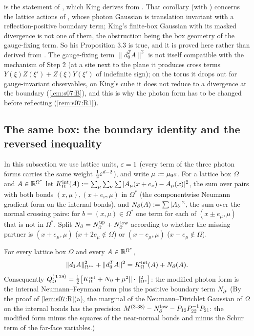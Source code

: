 \begin{remark}
 is the statement of \cite[Prop.~3.3]{K2}, which King derives from \cite[Cor.~5.4]{BFS1}. That corollary (with \cite[Lemma~5.2, Thm.~5.3]{BFS1}) concerns the lattice actions of \cite[\S5]{BFS1}, whose photon Gaussian is translation invariant with a reflection-positive boundary term; King's finite-box Gaussian with its masked divergence is not one of them, the obstruction being the box geometry of the gauge-fixing term. So his Proposition 3.3 is true, and it is proved here rather than derived from \cite[Cor.~5.4]{BFS1}. The gauge-fixing term $\|d_0^TA\|^2$ is not itself compatible with the mechanism of Step 2 (at a site next to the plane it produces cross terms $Y(\xi)Z(\xi')+Z(\xi)Y(\xi')$ of indefinite sign); on the torus it drops out for gauge-invariant observables, on King's cube it does not reduce to a divergence at the boundary (\cref{lem:s07:B}), and this is why the photon form has to be changed before reflecting (\cref{rem:s07:R1}).
\end{remark}

\subsection{The same box: the boundary identity and the reversed inequality}

In this subsection we use lattice units, $\varepsilon=1$ (every term of the three photon forms carries the same weight $\frac12\varepsilon^{d-2}$), and write $\mu:=\mu_0\varepsilon$. For a lattice box $\Omega$ and $A\in\mathbb R^{\Omega^*}$ let $K^{\rm int}_\Omega(A):=\sum_\mu\sum_\nu\sum|A_\mu(x+e_\nu)-A_\mu(x)|^2$, the sum over pairs with both bonds $(x,\mu),(x+e_\nu,\mu)$ in $\Omega^*$ (the componentwise Neumann gradient form on the internal bonds), and $N_\partial(A):=\sum|A_b|^2$, the sum over the normal crossing pairs: for $b=(x,\mu)\in\Omega^*$ one term for each of $(x\pm e_\mu,\mu)$ that is not in $\Omega^*$. Split $N_\partial=N^{\rm up}_\partial+N^{\rm low}_\partial$ according to whether the missing partner is $(x+e_\mu,\mu)$ (\ie $x+2e_\mu\notin\Omega$) or $(x-e_\mu,\mu)$ (\ie $x-e_\mu\notin\Omega$).

\begin{lemma}\label{lem:s07:B}
For every lattice box $\Omega$ and every $A\in\mathbb R^{\Omega^*}$,
\[
\|d_1A\|^2_{\Omega^{**}}+\|d_0^TA\|^2=K^{\rm int}_\Omega(A)+N_\partial(A).
\]
Consequently $Q^{(3.38)}_\Omega=\frac12\big[K^{\rm int}_\Omega+N_\partial+\mu^2\|\cdot\|^2_{\Omega^*}\big]$: the modified photon form is the internal Neumann--Feynman form plus the positive boundary term $N_\partial$. (By the proof of \cref{lem:s07:R}(a), the marginal of the Neumann--Dirichlet Gaussian of $\Omega$ on the internal bonds has the precision $M^{(3.38)}-N^{\rm low}_\partial-P_{12}P_{22}^{-1}P_{21}$: the modified form minus the squares of the near-normal bonds and minus the Schur term of the far-face variables.)
\end{lemma}

